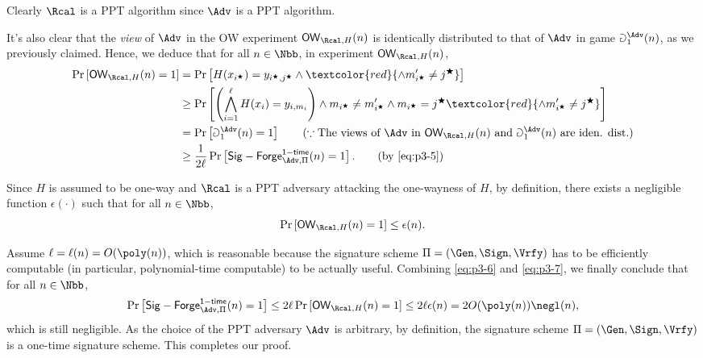 \begin{answer}
    Clearly $\Rcal$ is a PPT algorithm since $\Adv$ is a PPT algorithm.

    It's also clear that the \textit{view} of $\Adv$ in the OW experiment $\mathsf{OW}_{\Rcal, H}(n)$ is identically distributed to that of $\Adv$ in game $\Game_1^\Adv(n)$, as we previously claimed.
    Hence, we deduce that for all $n\in\Nbb$, in experiment $\mathsf{OW}_{\Rcal, H}(n)$,
    \begin{align}\label{eq:p3-6}
        \Pr\left[\mathsf{OW}_{\Rcal, H}(n)=1  \right]
        &= \Pr\left[H(x_{i^\bigstar})=y_{i^\bigstar, j^\bigstar} \land \textcolor{red}{\land m'_{i^\bigstar}\neq j^\bigstar} \right] \notag\\
        &\ge \Pr\left[\left( \bigwedge_{i=1}^\ell H(x_i)=y_{i, m_i} \right) \land m_{i^\bigstar}\neq m'_{i^\bigstar} \land  m_{i^\bigstar} = j^\bigstar  \textcolor{red}{\land m'_{i^\bigstar}\neq j^\bigstar} \right] \notag\\
        &= \Pr\left[\Game_1^\Adv(n)=1  \right]
        \qquad (\because \textrm{The views of $\Adv$ in $\mathsf{OW}_{\Rcal, H}(n)$ and $\Game_1^\Adv(n)$ are iden. dist.}) \notag\\
        &\ge \frac{1}{2\ell}  \Pr\left[\mathsf{Sig-Forge}^{\mathsf{1-time}}_{\Adv, \Pi}(n)=1  \right].
        \qquad (\textrm{by \eqref{eq:p3-5}})
    \end{align}

    Since $H$ is assumed to be one-way and $\Rcal$ is a PPT adversary attacking the one-wayness of $H$, by definition, there exists a negligible function $\epsilon(\cdot)$ such that for all $n\in\Nbb$,
    \begin{equation}\label{eq:p3-7}
        \Pr\left[\mathsf{OW}_{\Rcal, H}(n)=1  \right] \le \epsilon(n).
    \end{equation}

    Assume $\ell=\ell(n)=O(\poly(n))$, which is reasonable because the signature scheme $\Pi = (\Gen, \Sign, \Vrfy)$ has to be efficiently computable (in particular, polynomial-time computable) to be actually useful. 
    Combining \eqref{eq:p3-6} and \eqref{eq:p3-7}, we finally conclude that for all $n\in\Nbb$,
    \[
        \Pr\left[\mathsf{Sig-Forge}^{\mathsf{1-time}}_{\Adv, \Pi}(n)=1  \right]
        \le 2\ell \Pr\left[\mathsf{OW}_{\Rcal, H}(n)=1  \right] \le 2\ell \epsilon(n)
        =2O(\poly(n)) \negl(n),
    \]
    which is still negligible. 
    As the choice of the PPT adversary $\Adv$ is arbitrary, by definition, the signature scheme $\Pi = (\Gen, \Sign, \Vrfy)$ is a one-time signature scheme.  This completes our proof.
\end{answer}